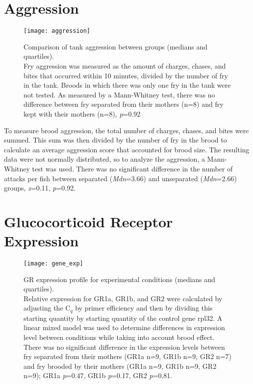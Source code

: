 \documentclass[12pt,twoside]{reedthesis}
\begin{document}
\section{Aggression}
\begin{figure}[htbp] 
\begin{center} 
\texttt{[image: aggression]}
\caption[Comparison of tank aggression between
groups]{\footnotesize{Comparison of tank aggression between groups (medians and quartiles).\\ Fry aggression was measured
  as the amount of charges, chases, and bites that occurred within 10 minutes,
  divided by the number of fry in the tank. Broods in which there was only one
  fry in the tank were not tested. As measured by a Mann-Whitney test,
  there was no difference between fry separated from their mothers (n=8) and fry kept
  with their mothers (n=8), \textit{p}=0.92}}
\label{subd}
\end{center} 
\end{figure}

To measure brood aggression, the total number of charges, chases, and
bites were summed. This sum was then divided by the number of fry in the brood
to calculate an average aggression score that accounted for brood size. The
resulting data were not normally distributed, so to analyze the aggression, a Mann-Whitney test was used. There was no
significant difference in the number of attacks per fish between separated
(\textit{Mdn}=3.66) and unseparated (\textit{Mdn}=2.66) groups, \textit{z}=0.11, \textit{p}=0.92.

\section{Glucocorticoid Receptor Expression}

\begin{figure}[htbp] 
\begin{center} 
\texttt{[image: gene\_exp]}
\caption[GR expression profile for experimental
conditions]{\footnotesize{GR expression profile for experimental
      conditions (medians and quartiles).\\ Relative expression for GR1a, GR1b, and GR2 were calculated
  by adjusting the C$_{q}$ by primer efficiency and then by dividing this starting
  quantity by starting quantity of the control gene rpl32. A linear mixed model
  was used to determine differences in expression level between conditions while
  taking into account brood effect. There was no
  significant difference in the expression levels between fry separated from
  their mothers (GR1a n=9, GR1b n=9, GR2 n=7) and fry brooded by their mothers
  (GR1a n=9, GR1b n=9, GR2 n=9); GR1a
  \textit{p}=0.47, GR1b \textit{p}=0.17, GR2 \textit{p}=0.81.}}
\label{subd}
\end{center} 
\end{figure}
\end{document}
